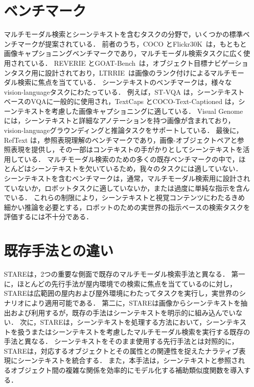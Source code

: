 \section{ベンチマーク}
マルチモーダル検索とシーンテキストを含むタスクの分野で，いくつかの標準ベンチマークが提案されている．
前者のうち，COCO \cite{Lin2014MicrosoftCC}とFlickr30K~\cite{flickr30k}は，もともと画像キャプショニングベンチマークであり，マルチモーダル検索タスクに広く使用されている．
REVERIE \cite{qi2020reverie}とGOAT-Bench~\cite{khanna2024goatbench}は，オブジェクト目標ナビゲーションタスク用に設計されており，LTRRIE~\cite{multirankit}は画像のランク付けによるマルチモーダル検索に焦点を当てている．
シーンテキストのベンチマークは，様々なvision-languageタスクにわたっている．
例えば，ST-VQA \cite{stvqa}は，シーンテキストベースのVQAに一般的に使用され，TextCaps \cite{textcaps}とCOCO-Text-Captioned \cite{stacmr}は，シーンテキストを考慮した画像キャプショニングに適している．
Visual Genome \cite{Krishna2017}には，シーンテキストと詳細なアノテーションを持つ画像が含まれており，vision-languageグラウンディングと推論タスクをサポートしている．
最後に，RefText \cite{stan}は，参照表現理解のベンチマークであり，画像-オブジェクトペアと参照表現を提供し，その一部はコンテキストの手がかりとしてシーンテキストを活用している．
マルチモーダル検索のための多くの既存ベンチマークの中で，ほとんどはシーンテキストを欠いているため，我々のタスクには適していない．
シーンテキストを含むベンチマークは，通常，マルチモーダル検索用に設計されていないか，ロボットタスクに適していないか，または過度に単純な指示を含んでいる．
これらの制限により，シーンテキストと視覚コンテンツにわたるきめ細かい推論を必要とする，ロボットのための実世界の指示ベースの検索タスクを評価するには不十分である．

\section{既存手法との違い}
STAREは，2つの重要な側面で既存のマルチモーダル検索手法と異なる．
第一に，ほとんどの先行手法が屋内環境での検索に焦点を当てているのに対し，STAREは広範囲の屋内および屋外環境にわたってタスクを実行し，実世界のシナリオにより適用可能である．
第二に，STAREは画像からシーンテキストを抽出および利用するが，既存の手法はシーンテキストを明示的に組み込んでいない．
次に，STAREは，シーンテキストを処理する方法において，シーンテキストを扱うまたはシーンテキストを考慮したマルチモーダル検索を実行する既存の手法と異なる．
シーンテキストをそのまま使用する先行手法とは対照的に，STAREは，対応するオブジェクトとその属性との関連性を捉えたナラティブ表現にシーンテキストを統合する．
また，本手法は，シーンテキストと参照されるオブジェクト間の複雑な関係を効率的にモデル化する補助類似度関数を導入する．
